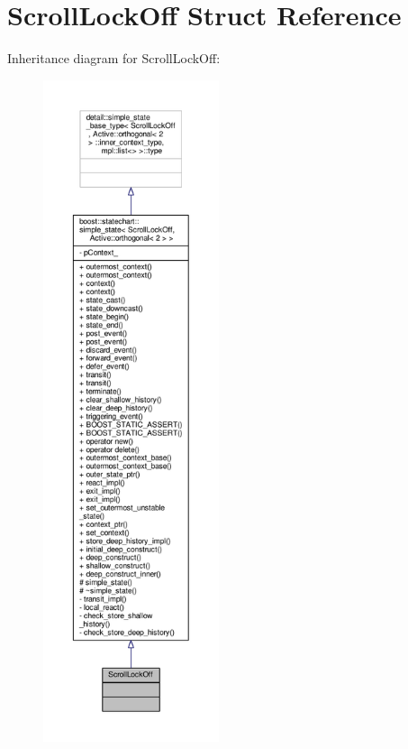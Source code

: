 \hypertarget{struct_scroll_lock_off}{}\section{Scroll\+Lock\+Off Struct Reference}
\label{struct_scroll_lock_off}


Inheritance diagram for Scroll\+Lock\+Off\+:
\nopagebreak
\begin{figure}[H]
\begin{center}
\leavevmode
\includegraphics[height=550pt]{struct_scroll_lock_off__inherit__graph}
\end{center}
\end{figure}


